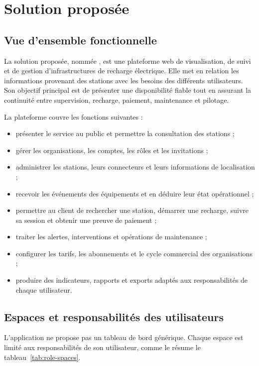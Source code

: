 \section{Solution proposée}

\subsection{Vue d'ensemble fonctionnelle}

La solution proposée, nommée \ProjectName{}, est une plateforme web de visualisation,
de suivi et de gestion d'infrastructures de recharge électrique. Elle met en relation
les informations provenant des stations avec les besoins des différents utilisateurs.
Son objectif principal est de présenter une disponibilité fiable tout en assurant la
continuité entre supervision, recharge, paiement, maintenance et pilotage.

La plateforme couvre les fonctions suivantes :

\begin{itemize}[leftmargin=7mm]
  \item présenter le service au public et permettre la consultation des stations ;
  \item gérer les organisations, les comptes, les rôles et les invitations ;
  \item administrer les stations, leurs connecteurs et leurs informations de
  localisation ;
  \item recevoir les événements des équipements et en déduire leur état opérationnel ;
  \item permettre au client de rechercher une station, démarrer une recharge, suivre
  sa session et obtenir une preuve de paiement ;
  \item traiter les alertes, interventions et opérations de maintenance ;
  \item configurer les tarifs, les abonnements et le cycle commercial des
  organisations ;
  \item produire des indicateurs, rapports et exports adaptés aux responsabilités de
  chaque utilisateur.
\end{itemize}

\subsection{Espaces et responsabilités des utilisateurs}

L'application ne propose pas un tableau de bord générique. Chaque espace est limité
aux responsabilités de son utilisateur, comme le résume le
tableau~\ref{tab:role-spaces}.

